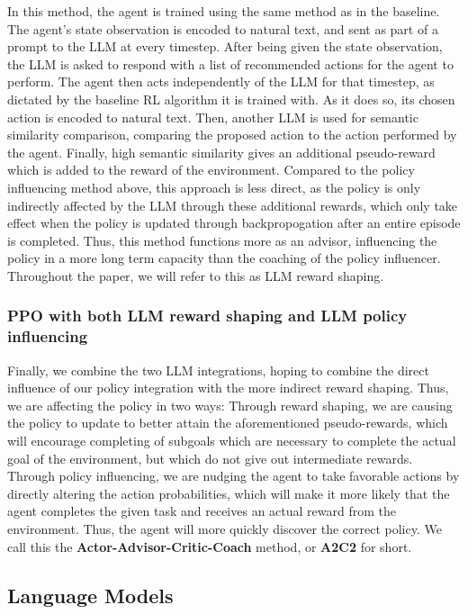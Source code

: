 \documentclass[conference]{IEEEtran}
\begin{document}
In this method, the agent is trained using the same method as in the baseline. The agent's state observation is encoded to natural text, and sent as part of a prompt to the LLM at every timestep. After being given the state observation, the LLM is asked to respond with a list of recommended actions for the agent to perform. The agent then acts independently of the LLM for that timestep, as dictated by the baseline RL algorithm it is trained with. As it does so, its chosen action is encoded to natural text. Then, another LLM is used for semantic similarity comparison, comparing the proposed action to the action performed by the agent. Finally, high semantic similarity gives an additional pseudo-reward which is added to the reward of the environment. Compared to the policy influencing method above, this approach is less direct, as the policy is only indirectly affected by the LLM through these additional rewards, which only take effect when the policy is updated through backpropogation after an entire episode is completed. Thus, this method functions more as an advisor, influencing the policy in a more long term capacity than the coaching of the policy influencer. Throughout the paper, we will refer to this as LLM reward shaping.

\subsubsection{PPO with both LLM reward shaping and LLM policy influencing}

Finally, we combine the two LLM integrations, hoping to combine the direct influence of our policy integration with the more indirect reward shaping. Thus, we are affecting the policy in two ways: Through reward shaping, we are causing the policy to update to better attain the aforementioned pseudo-rewards, which will encourage completing of subgoals which are necessary to complete the actual goal of the environment, but which do not give out intermediate rewards. Through policy influencing, we are nudging the agent to take favorable actions by directly altering the action probabilities, which will make it more likely that the agent completes the given task and receives an actual reward from the environment. Thus, the agent will more quickly discover the correct policy. We call this the \textbf{Actor-Advisor-Critic-Coach} method, or \textbf{A2C2} for short.


\subsection{Language Models}
\end{document}
